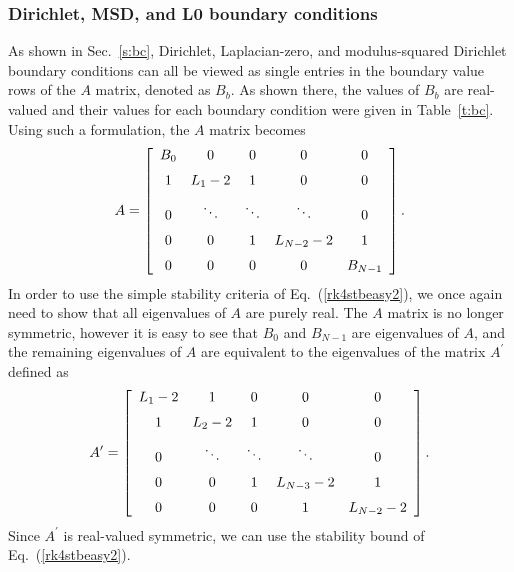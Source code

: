\documentclass{article}
\begin{document}
\subsubsection{Dirichlet, MSD, and L0 boundary conditions}
\label{s:1dcdbc2}
As shown in Sec.~\ref{s:bc}, Dirichlet, Laplacian-zero, and modulus-squared Dirichlet boundary conditions can all be viewed as single entries in the boundary value rows of the $A$ matrix, denoted as $B_b$.  As shown there, the values of $B_b$ are real-valued and their values for each boundary condition were given in Table~\ref{t:bc}.  Using such a formulation, the $A$ matrix becomes
\[
A = \left[ \begin {array}{cccccc}  B_0&0     &0  &0  &0         \\\noalign{\medskip}
                                   1  &L_1-2 &1  &0  &0         \\\noalign{\medskip}
                                   0  &\ddots   &\ddots &\ddots          &0\\\noalign{\medskip}
                                   0  &0      &1  &L_{N-2}-2 &1\\\noalign{\medskip}
                                   0  &0       &0  &0         &B_{N-1}\end {array} \right]. 
\]
In order to use the simple stability criteria of Eq.~(\ref{rk4stbeasy2}), we once again need to show that all eigenvalues of $A$ are purely real.  The $A$ matrix is no longer symmetric, however it is easy to see that $B_0$ and $B_{N-1}$ are eigenvalues of $A$, and the remaining eigenvalues of $A$ are equivalent to the eigenvalues of the matrix $A^{\prime}$ defined as
\[
A^\prime = \left[\begin {array}{cccccc}
L_1-2&1    &0  &0        &0\\\noalign{\medskip}
1    &L_2-2&1  &0        &0\\\noalign{\medskip}
0    &\ddots    &\ddots &\ddots       &0\\\noalign{\medskip}
0    &0    &1 &L_{N-3}-2&1\\\noalign{\medskip}
0    &0    &0  &1        &L_{N-2}-2
\end {array} \right].
\]
Since $A^{\prime}$ is real-valued symmetric, we can use the stability bound of Eq.~(\ref{rk4stbeasy2}).  
\end{document}
